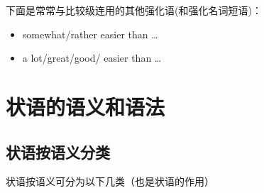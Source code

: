 下面是常常与比较级连用的其他强化语(和强化名词短语)：
\begin{itemize}
\item somewhat/rather easier than \ldots{}
\item a lot/great/good/ easier than \ldots{}
\end{itemize}

\section{状语的语义和语法}

\subsection{状语按语义分类}

状语按语义可分为以下几类（也是状语的作用）
